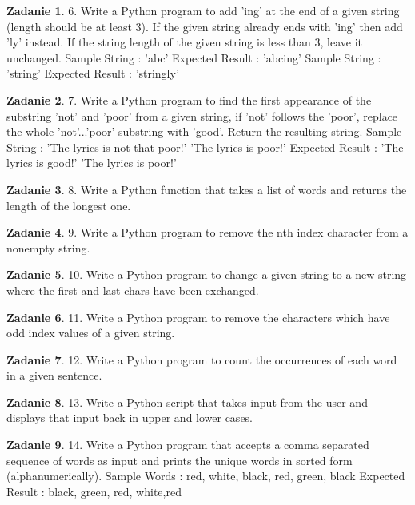 \documentclass[11pt]{article}
\theoremstyle{definition}
\newtheorem{zadanie}{Zadanie}
\begin{document}
\begin{zadanie}
6. Write a Python program to add 'ing' at the end of a given string (length should be at least 3). If the given string already ends with 'ing' then add 'ly' instead. If the string length of the given string is less than 3, leave it unchanged.
Sample String : 'abc'
Expected Result : 'abcing'
Sample String : 'string'
Expected Result : 'stringly'
\end{zadanie}

\begin{zadanie}
7. Write a Python program to find the first appearance of the substring 'not' and 'poor' from a given string, if 'not' follows the 'poor', replace the whole 'not'...'poor' substring with 'good'. Return the resulting string.
Sample String : 'The lyrics is not that poor!'
'The lyrics is poor!'
Expected Result : 'The lyrics is good!'
'The lyrics is poor!'
\end{zadanie}

\begin{zadanie}
8. Write a Python function that takes a list of words and returns the length of the longest one.
\end{zadanie}

\begin{zadanie}
9. Write a Python program to remove the nth index character from a nonempty string.
\end{zadanie}

\begin{zadanie}
10. Write a Python program to change a given string to a new string where the first and last chars have been exchanged.
\end{zadanie}

\begin{zadanie}
11. Write a Python program to remove the characters which have odd index values of a given string.
\end{zadanie}

\begin{zadanie}
12. Write a Python program to count the occurrences of each word in a given sentence.
\end{zadanie}

\begin{zadanie}
13. Write a Python script that takes input from the user and displays that input back in upper and lower cases.
\end{zadanie}

\begin{zadanie}
14. Write a Python program that accepts a comma separated sequence of words as input and prints the unique words in sorted form (alphanumerically).
Sample Words : red, white, black, red, green, black
Expected Result : black, green, red, white,red
\end{zadanie}
\end{document}
